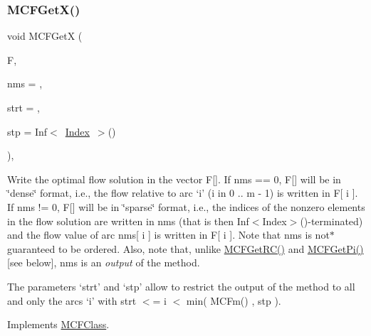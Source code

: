 \subsubsection{\texorpdfstring{M\+C\+F\+Get\+X()}{MCFGetX()}\hspace{0.1cm}{\footnotesize\ttfamily [3/4]}}
{\footnotesize\ttfamily void M\+C\+F\+GetX (\begin{DoxyParamCaption}\item[{\mbox{\hyperlink{class_m_c_f_class_a9dae1f1a39c208ce3c2b337cd5bb3d00}{F\+Row}}}]{F,  }\item[{\mbox{\hyperlink{class_m_c_f_class_ace3388eb329ff0551a0b86b6c67e33d8}{Index\+\_\+\+Set}}}]{nms = {},  }\item[{\mbox{\hyperlink{class_m_c_f_class_a76aaabb20535c51a2752b93f6c38fe54}{c\+Index}}}]{strt = {},  }\item[{\mbox{\hyperlink{class_m_c_f_class_ad53d6229d7ec28555a9c9c2fd9abf773}{Index}}}]{stp = {\ttfamily Inf$<$~\mbox{\hyperlink{class_m_c_f_class_ad53d6229d7ec28555a9c9c2fd9abf773}{Index}}~$>$()} }\end{DoxyParamCaption})\hspace{0.3cm}{\ttfamily [override]}, {\ttfamily [virtual]}}

Write the optimal flow solution in the vector F\mbox{[}\mbox{]}. If nms == 0, F\mbox{[}\mbox{]} will be in \char`\"{}dense\char`\"{} format, i.\+e., the flow relative to arc `i' (i in 0 .. m -\/ 1) is written in F\mbox{[} i \mbox{]}. If nms != 0, F\mbox{[}\mbox{]} will be in \char`\"{}sparse\char`\"{} format, i.\+e., the indices of the nonzero elements in the flow solution are written in nms (that is then Inf$<$\+Index$>$()-\/terminated) and the flow value of arc nms\mbox{[} i \mbox{]} is written in F\mbox{[} i \mbox{]}. Note that nms is not$\ast$ guaranteed to be ordered. Also, note that, unlike \mbox{\hyperlink{class_m_c_f_class_af027cee8179a876a4879c73820c380d1}{M\+C\+F\+Get\+R\+C()}} and \mbox{\hyperlink{class_s_p_tree_a2eb8e4b396fb6d82d56dcb9b7fbe871b}{M\+C\+F\+Get\+Pi()}} \mbox{[}see below\mbox{]}, nms is an {\itshape output} of the method.

The parameters `strt' and `stp' allow to restrict the output of the method to all and only the arcs `i' with strt $<$= i $<$ min( M\+C\+Fm() , stp ). 

Implements \mbox{\hyperlink{class_m_c_f_class_a884f1180138ddf3df909347b1c85428c}{M\+C\+F\+Class}}.

\mbox{\label{class_s_p_tree_afe1dba1878b1ac62056bbba3368e23f6}} 
